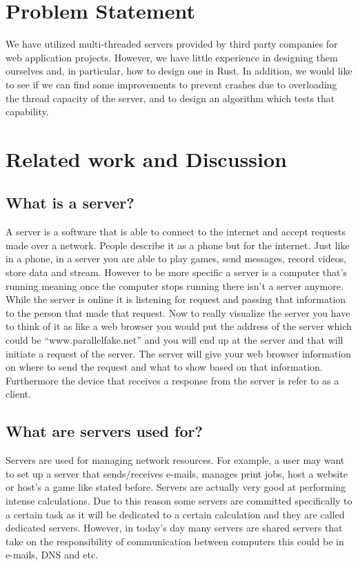 \documentclass[conference]{IEEEtran}
\begin{document}
\section{Problem Statement}
We have utilized multi-threaded servers provided by third party companies for web application projects. However, we have little experience in designing them ourselves and, in particular, how to design one in Rust. In addition, we would like to see if we can find some improvements to prevent crashes due to overloading the thread capacity of the server, and to design an algorithm which tests that capability.
\section{Related work and Discussion}
\subsection*{What is a server?}
A server is a software that is able to connect to the internet and accept requests made over a network. People describe it as a phone but for the internet. Just like in a phone, in a server you are able to play games, send messages, record videos, store data and stream. However to be more specific a server is a computer that’s running meaning once the computer stops running there isn’t a server anymore. While the server is online it is listening for request and passing that information to the person that made that request. Now to really visualize the server you have to think of it as like a web browser you would put the address of the server which could be “www.parallelfake.net” and you will end up at the server and that will initiate a request of the server. The server will give your web browser information on where to send the request and what to show based on that information. Furthermore the device that receives a response from the server is refer to as a client.
\linebreak
\subsection*{What are servers used for?}
Servers are used for managing network resources. For example, a user may want to set up a server that sends/receives e-mails, manages print jobs, host a website or host’s a game like stated before.  Servers are actually very good at performing intense calculations. Due to this reason some servers are committed specifically to a certain task as it will be dedicated to a certain calculation and they are called dedicated servers. However, in today's day many servers are shared servers that take on the responsibility of communication between computers this could be in e-mails, DNS and etc.
\end{document}
